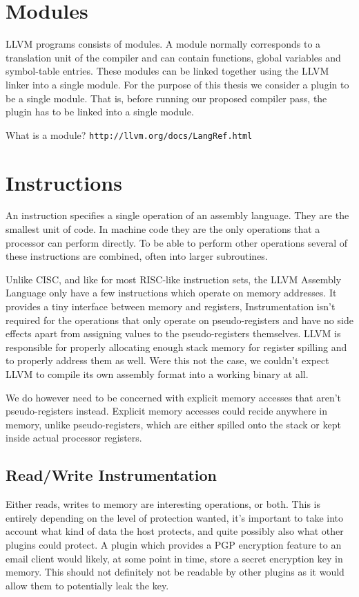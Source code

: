 \section {Modules}

LLVM programs consists of modules. A module normally corresponds to a
translation unit of the compiler and can contain functions, global variables and
symbol-table entries. These modules can be linked together using the LLVM
linker into a single module. For the purpose of this thesis we consider a plugin
to be a single module. That is, before running our proposed compiler pass, the
plugin has to be linked into a single module.

What is a module? \texttt{http://llvm.org/docs/LangRef.html}


\section {Instructions}

An instruction specifies a single operation of an assembly language. They are
the smallest unit of code. In machine code they are the only operations that a
processor can perform directly. To be able to perform other operations several
of these instructions are combined, often into larger subroutines.

Unlike CISC, and like for most RISC-like instruction sets, the LLVM Assembly
Language only have a few instructions which operate on memory addresses. It
provides a tiny interface between memory and registers, Instrumentation isn't
required for the operations that only operate on pseudo-registers and have no
side effects apart from assigning values to the pseudo-registers themselves.
LLVM is responsible for properly allocating enough stack memory for register
spilling and to properly address them as well. Were this not the case, we
couldn't expect LLVM to compile its own assembly format into a working binary at
all.

We do however need to be concerned with explicit memory accesses that aren't
pseudo-registers instead. Explicit memory accesses could recide anywhere in
memory, unlike pseudo-registers, which are either spilled onto the stack or kept
inside actual processor registers.

\subsection {Read/Write Instrumentation}

Either reads, writes to memory are interesting operations, or both. This is
entirely depending on the level of protection wanted, it's important to take
into account what kind of data the host protects, and quite possibly also what
other plugins could protect. A plugin which provides a PGP encryption feature to
an email client would likely, at some point in time, store a secret encryption
key in memory. This should not definitely not be readable by other plugins as it
would allow them to potentially leak the key.

